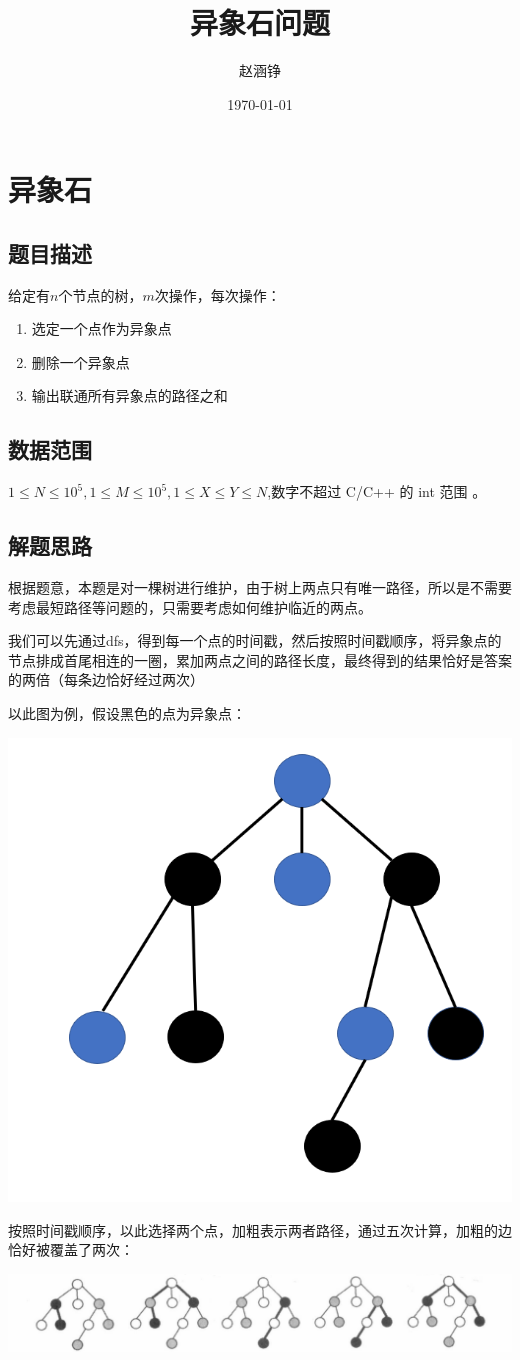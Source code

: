 \documentclass[UTF8]{ctexart}
\title{异象石问题}
\author{赵涵铮}
\date{\today}
\begin{document}
	\maketitle
	
	\section{异象石}
	\subsection{题目描述}
	给定有$n$个节点的树，$m$次操作，每次操作：
	\begin{enumerate}
		\item 选定一个点作为异象点
		\item 删除一个异象点
		\item 输出联通所有异象点的路径之和
	\end{enumerate}
	\subsection{数据范围}
	$1\leq N\leq 10^5,1\leq M\leq 10^5,1\leq X \leq Y\leq N$,数字不超过 C/C++ 的 int 范围	。
	\subsection{解题思路}
	根据题意，本题是对一棵树进行维护，由于树上两点只有唯一路径，所以是不需要考虑最短路径等问题的，只需要考虑如何维护临近的两点。
	
	我们可以先通过dfs，得到每一个点的时间戳，然后按照时间戳顺序，将异象点的节点排成首尾相连的一圈，累加两点之间的路径长度，最终得到的结果恰好是答案的两倍（每条边恰好经过两次）
	
	以此图为例，假设黑色的点为异象点：
	
	
		\includegraphics[width =0.3\linewidth]{./figure/simple}
	
	
	按照时间戳顺序，以此选择两个点，加粗表示两者路径，通过五次计算，加粗的边恰好被覆盖了两次：
	
		\includegraphics[width = \linewidth]{./figure/sum}
	
\end{document}
